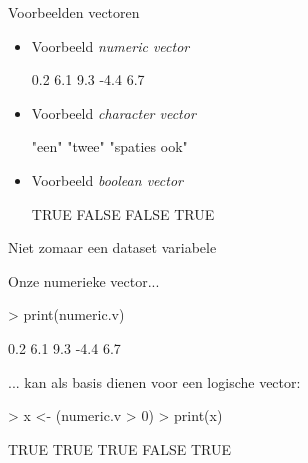 \documentclass{beamer}
\begin{document}


\begin{frame}[fragile]{Voorbeelden vectoren}



\begin{itemize}

\item
Voorbeeld \textit{numeric vector}
\begin{Schunk}
\begin{Soutput}
[1]  0.2  6.1  9.3 -4.4  6.7
\end{Soutput}
\end{Schunk}
\vspace{30pt}
\item
Voorbeeld \textit{character vector}
\begin{Schunk}
\begin{Soutput}
[1] "een"         "twee"        "spaties ook"
\end{Soutput}
\end{Schunk}
\vspace{30pt}
\item
Voorbeeld \textit{boolean vector}
\begin{Schunk}
\begin{Soutput}
[1]  TRUE FALSE FALSE  TRUE
\end{Soutput}
\end{Schunk}
\end{itemize}
\end{frame}


\begin{frame}[fragile]{Niet zomaar een dataset variabele}

Onze numerieke vector... 
\begin{Schunk}
\begin{Sinput}
> print(numeric.v)
\end{Sinput}
\begin{Soutput}
[1]  0.2  6.1  9.3 -4.4  6.7
\end{Soutput}
\end{Schunk}
\vspace{20pt}
... kan als basis dienen voor een logische vector: 
\begin{Schunk}
\begin{Sinput}
> x <- (numeric.v > 0)
> print(x)
\end{Sinput}
\begin{Soutput}
[1]  TRUE  TRUE  TRUE FALSE  TRUE
\end{Soutput}
\end{Schunk}


\end{frame}
\end{document}
